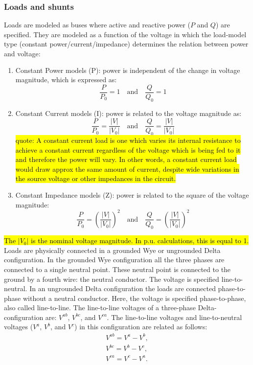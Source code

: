 \documentclass[10pt,journal]{article}
\begin{document}
\subsubsection{Loads and shunts}
Loads are modeled as buses where active and reactive power ($P$ and $Q$) are specified. They are modeled as a function of the voltage in which the load-model type (constant power/current/impedance) determines the relation between power and voltage:  
\begin{enumerate}
    \item Constant Power models (P): power is independent of the change in voltage magnitude, which is expressed as: $$
    \frac{P}{P_0} =1 \quad\mbox{and}\quad \frac{Q}{Q_0}=1
    $$
    \item Constant Current models (I): power is related to the voltage magnitude as: $$
        \frac{P}{P_0} =\frac{|V|}{|V_0|} \quad\mbox{and}\quad \frac{Q}{Q_0}=\frac{|V|}{|V_0|}
    $$
    \hl{quote: A constant current load is one which varies its internal resistance to achieve a constant current regardless of the voltage which is being fed to it and therefore the power will vary. In other words, a constant current load would draw approx the same amount of current, despite wide variations in the source voltage or other impedances in the circuit.}
    \item Constant Impedance models (Z): power is related to the square of the voltage magnitude: $$
        \frac{P}{P_0} =(\frac{|V|}{|V_0|})^2 \quad\mbox{and}\quad \frac{Q}{Q_0}=(\frac{|V|}{|V_0|})^2
    $$
\end{enumerate}
\hl{The $|V_0|$ is the nominal voltage magnitude. In p.u. calculations, this is equal to 1. }\\ 
Loads are physically connected in a grounded Wye or ungrounded Delta configuration. In the grounded Wye configuration all the three phases are connected to a single neutral point. These neutral point is connected to the ground by a fourth wire: the neutral conductor. The voltage is specified line-to-neutral.
In an ungrounded Delta configuration the loads are connected phase-to-phase without a neutral conductor. Here, the voltage is specified phase-to-phase, also called line-to-line. The line-to-line voltages of a three-phase Delta-configuration are: $V^{ab}$, $V^{bc}$, and $V^{ca}$.  The line-to-line voltages and line-to-neutral voltages ($V^a$, $V^b$, and $V^c$) in this configuration are related as follows:
\begin{align}
    V^{ab} = V^a - V^b,\\ 
    V^{bc} = V^b - V^c,\\ 
    V^{ca} = V^c - V^a.\\ 
\end{align}
\end{document}
